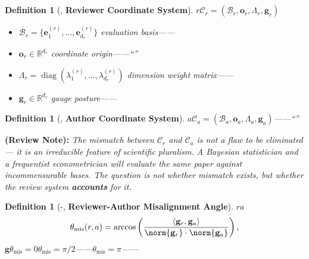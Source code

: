 \documentclass[12pt,a4paper]{article}
\newtheorem{definition}[theorem]{Definition}
\theoremstyle{remark}
\newcommand{\R}{\mathbb{R}}
\newcommand{\coordSys}{\mathcal{C}}
\newcommand{\gaugeVec}{\mathbf{g}}
\newcommand{\misalignAngle}{\theta_{\text{mis}}}
\DeclareMathOperator{\diag}{diag}
\newcommand{\reviewnote}[1]{%
    \medskip\noindent
    \textbf{ (Review Note):} \textit{#1}%
}
\begin{document}
\subsection{}

\begin{definition}[, \textbf{Reviewer Coordinate System}]
\label{def:reviewer_coords}
$r$\textbf{}$\coordSys_r = (\mathcal{B}_r, \mathbf{o}_r, \Lambda_r, \gaugeVec_r)$
\begin{itemize}
    \item $\mathcal{B}_r = \{\mathbf{e}_1^{(r)}, \dots, \mathbf{e}_{d_r}^{(r)}\}$ \textbf{}evaluation basis——
    \item $\mathbf{o}_r \in \R^{d_r}$ \textbf{}coordinate origin——``''
    \item $\Lambda_r = \diag(\lambda_1^{(r)}, \dots, \lambda_{d_r}^{(r)})$ \textbf{}dimension weight matrix——
    \item $\gaugeVec_r \in \R^{d_r}$ \textbf{}gauge posture——
\end{itemize}
\end{definition}

\begin{definition}[, \textbf{Author Coordinate System}]
\label{def:author_coords}
$a$\textbf{}$\coordSys_a = (\mathcal{B}_a, \mathbf{o}_a, \Lambda_a, \gaugeVec_a)$——``''
\end{definition}

\reviewnote{The mismatch between $\coordSys_r$ and $\coordSys_a$ is not a flaw to be eliminated — it is an irreducible feature of scientific pluralism. A Bayesian statistician and a frequentist econometrician will evaluate the same paper against incommensurable bases. The question is not whether mismatch exists, but whether the review system \textbf{accounts} for it.}

\begin{definition}[-, \textbf{Reviewer-Author Misalignment Angle}]
\label{def:misalignment_angle}
$r$$a$\textbf{}
\begin{equation}
    \misalignAngle(r, a) = \arccos\left(\frac{\langle \gaugeVec_r, \gaugeVec_a \rangle}{\norm{\gaugeVec_r} \cdot \norm{\gaugeVec_a}}\right),
    \label{eq:misalignment_angle}
\end{equation}
$\gaugeVec$$\misalignAngle = 0$$\misalignAngle = \pi/2$——$\misalignAngle = \pi$——
\end{definition}

\subsection{}
\end{document}
